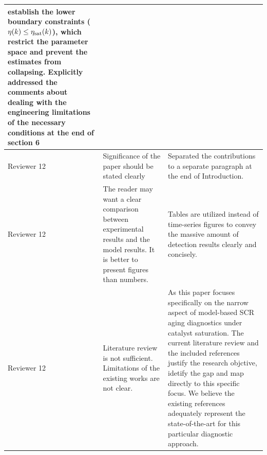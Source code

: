 \documentclass[letterpaper, 11pt]{article}
\begin{document}
\begin{longtable}{>{\raggedright\arraybackslash}p{}>{\raggedright\arraybackslash}p{}>{\raggedright\arraybackslash}p{}}
    establish the lower boundary constraints ($\eta(k) \le \eta_{\text{sat}}(k)$), which restrict the parameter space and
    prevent the estimates from collapsing.
    \newline\newline
    Explicitly addressed the comments about dealing with the engineering limitations of the necessary conditions at the end of section 6       \\ \midrule
    Reviewer 12                                                                                                                              &
    Significance of the paper should be stated clearly                                                                                       &
    Separated the contributions to a separate paragraph at the end of Introduction.                                                            \\ \midrule
    Reviewer 12                                                                                                                              &
    The reader may want a clear comparison between experimental results and the model results. It is better to present figures than numbers. &
    Tables are utilized instead of time-series figures to convey the massive amount of detection results clearly and concisely.                \\ \midrule
    Reviewer 12                                                                                                                              &
    Literature review is not sufficient. Limitations of the existing works are not clear.                                                    &
    As this paper focuses specifically on the narrow aspect of model-based SCR aging diagnostics under catalyst saturation. The current literature review and the included references justify the research objctive, idetify the gap and map directly to this specific focus. We believe the existing references adequately represent the state-of-the-art for this particular diagnostic approach.
    \\ \bottomrule
\end{longtable}
\end{document}
